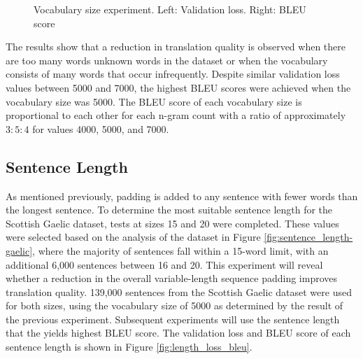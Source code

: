 \begin{figure}[ht!]
\centering
{}
\captionsetup{justification=centering}
\caption[Vocabulary size experiment validation loss and BLEU score]{Vocabulary size experiment. Left: Validation loss. Right: BLEU score}
\label{fig:vocab_loss_bleu}
\end{figure}

The results show that a reduction in translation quality is observed when there are too many words unknown words in the dataset or when the vocabulary consists of many words that occur infrequently. Despite similar validation loss values between 5000 and 7000, the highest \acrshort{BLEU} scores were achieved when the vocabulary size was 5000. The \acrshort{BLEU} score of each vocabulary size is proportional to each other for each n-gram count with a ratio of approximately $3:5:4$ for values 4000, 5000, and 7000. 


\subsection{Sentence Length}
\label{sec:4-sentence_length}

As mentioned previously, padding is added to any sentence with fewer words than the longest sentence. To determine the most suitable sentence length for the Scottish Gaelic dataset, tests at sizes 15 and 20 were completed. These values were selected based on the analysis of the dataset in Figure \ref{fig:sentence_length-gaelic}, where the majority of sentences fall within a 15-word limit, with an additional 6,000 sentences between 16 and 20. This experiment will reveal whether a reduction in the overall variable-length sequence padding improves translation quality.
139,000 sentences from the Scottish Gaelic dataset were used for both sizes, using the vocabulary size of 5000 as determined by the result of the previous experiment. Subsequent experiments will use the sentence length that the yields highest \acrshort{BLEU} score. The validation loss and \acrshort{BLEU} score of each sentence length is shown in Figure \ref{fig:length_loss_bleu}.

